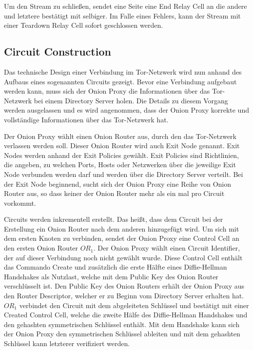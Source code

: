 \documentclass[fleqn,envcountsame,runningheads,10pt,a4paper]{llncs}
\begin{document}
Um den Stream zu schließen, sendet eine Seite eine End Relay Cell an die andere 
und letztere bestätigt mit selbiger. Im Falle eines Fehlers, kann der Stream mit 
einer Teardown Relay Cell sofort geschlossen werden.

\subsection{Circuit Construction}
\label{sec:ciruit_construction} 

Das technische Design einer Verbindung im Tor-Netzwerk wird nun anhand des 
Aufbaus eines sogenannten Circuits gezeigt. Bevor eine Verbindung aufgebaut 
werden kann, muss sich der Onion Proxy die Informationen über das Tor-Netzwerk 
bei einem Directory Server holen. Die Details zu diesem Vorgang werden 
ausgelassen und es wird angenommen, dass der Onion Proxy korrekte und 
vollständige Informationen über das Tor-Netzwerk hat.

Der Onion Proxy wählt einen Onion Router aus, durch den das Tor-Netzwerk 
verlassen werden soll. Dieser Onion Router wird auch Exit Node genannt. Exit 
Nodes werden anhand der Exit Policies gewählt. Exit Policies  sind Richtlinien, 
die angeben, zu welchen Ports, Hosts oder Netzwerken über die jeweilige Exit 
Node verbunden werden darf und werden über die Directory Server verteilt. Bei 
der Exit Node beginnend, sucht sich der Onion Proxy eine Reihe von Onion Router 
aus, so dass keiner der Onion Router mehr als ein mal pro Circuit vorkommt.

Circuits werden inkrementell erstellt. Das heißt, dass dem Circuit bei der 
Erstellung ein Onion Router nach dem anderen hinzugefügt wird. Um sich mit dem 
ersten Knoten zu verbinden, sendet der Onion Proxy eine Control Cell an den 
ersten Onion Router $\textit{OR}_1$. Der Onion Proxy wählt einen Circuit 
Identifier, der auf dieser Verbindung noch nicht gewählt wurde. Diese Control 
Cell enthält das Commando Create und zusätzlich die erste Hälfte eines 
Diffie-Hellman Handshakes als Nutzlast, welche mit dem Public Key des Onion 
Router verschlüsselt ist. Den Public Key des Onion Routers erhält der Onion 
Proxy aus den Router Descriptor, welcher er zu Beginn vom Directory Server 
erhalten hat. $\textit{OR}_1$ verbindet den Circuit mit dem abgeleiteten 
Schlüssel und  bestätigt mit einer Created Control Cell, welche die zweite Hälfe 
des Diffie-Hellman Handshakes und den gehashten symmetrischen Schlüssel enthält. 
Mit dem Handshake kann sich der Onion Proxy den symmetrischen Schlüssel ableiten 
und mit dem gehashten Schlüssel kann letzterer verifiziert werden.
\end{document}
